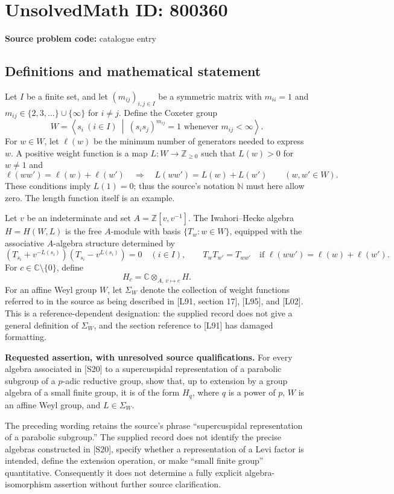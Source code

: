 \documentclass[11pt]{article}
\begin{document}
\section*{UnsolvedMath ID: 800360}
\textbf{Source problem code:} catalogue entry
\subsection{Definitions and mathematical statement}
Let \(I\) be a finite set, and let \((m_{ij})_{i,j\in I}\) be a symmetric matrix with \(m_{ii}=1\) and \(m_{ij}\in\{2,3,\ldots\}\cup\{\infty\}\) for \(i\ne j\). Define the Coxeter group
\[
W=\left\langle s_i\ (i\in I)\ \middle|\ (s_is_j)^{m_{ij}}=1\text{ whenever }m_{ij}<\infty\right\rangle.
\]
For \(w\in W\), let \(\ell(w)\) be the minimum number of generators needed to express \(w\). A positive weight function is a map \(L:W\to\mathbb Z_{\ge0}\) such that \(L(w)>0\) for \(w\ne1\) and
\[
\ell(ww')=\ell(w)+\ell(w')\quad\Longrightarrow\quad L(ww')=L(w)+L(w')
\qquad(w,w'\in W).
\]
These conditions imply \(L(1)=0\); thus the source's notation \(\mathbb N\) must here allow zero. The length function itself is an example.

Let \(v\) be an indeterminate and set \(A=\mathbb Z[v,v^{-1}]\). The Iwahori--Hecke algebra \(H=H(W,L)\) is the free \(A\)-module with basis \(\{T_w:w\in W\}\), equipped with the associative \(A\)-algebra structure determined by
\[
(T_{s_i}+v^{-L(s_i)})(T_{s_i}-v^{L(s_i)})=0\quad(i\in I),
\qquad
T_wT_{w'}=T_{ww'}\quad\text{if }\ell(ww')=\ell(w)+\ell(w').
\]
For \(c\in\mathbb C\setminus\{0\}\), define
\[
H_c=\mathbb C\otimes_{A,\,v\mapsto c}H.
\]
For an affine Weyl group \(W\), let \(\Sigma_W\) denote the collection of weight functions referred to in the source as being described in [L91, section 17], [L95], and [L02]. This is a reference-dependent designation: the supplied record does not give a general definition of \(\Sigma_W\), and the section reference to [L91] has damaged formatting.

\textbf{Requested assertion, with unresolved source qualifications.} For every algebra associated in [S20] to a supercuspidal representation of a parabolic subgroup of a \(p\)-adic reductive group, show that, up to extension by a group algebra of a small finite group, it is of the form \(H_q\), where \(q\) is a power of \(p\), \(W\) is an affine Weyl group, and \(L\in\Sigma_W\).

The preceding wording retains the source's phrase ``supercuspidal representation of a parabolic subgroup.'' The supplied record does not identify the precise algebras constructed in [S20], specify whether a representation of a Levi factor is intended, define the extension operation, or make ``small finite group'' quantitative. Consequently it does not determine a fully explicit algebra-isomorphism assertion without further source clarification.
\end{document}
